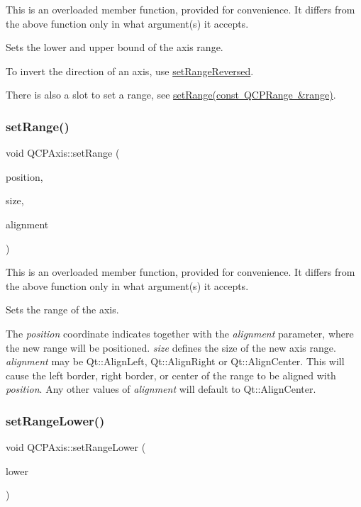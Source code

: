 This is an overloaded member function, provided for convenience. It differs from the above function only in what argument(s) it accepts.

Sets the lower and upper bound of the axis range.

To invert the direction of an axis, use \mbox{\hyperlink{class_q_c_p_axis_a2172fdb196b1a0dc3f40992fcad8e9e1}{set\+Range\+Reversed}}.

There is also a slot to set a range, see \mbox{\hyperlink{class_q_c_p_axis_aebdfea5d44c3a0ad2b4700cd4d25b641}{set\+Range(const Q\+C\+P\+Range \&range)}}. \mbox{\label{class_q_c_p_axis_acf60e5b2d631fbc8c4548c3d579cb6d0}} 
\subsubsection{\texorpdfstring{setRange()}{setRange()}\hspace{0.1cm}{\footnotesize\ttfamily [3/3]}}
{\footnotesize\ttfamily void Q\+C\+P\+Axis\+::set\+Range (\begin{DoxyParamCaption}\item[{double}]{position,  }\item[{double}]{size,  }\item[{Qt\+::\+Alignment\+Flag}]{alignment }\end{DoxyParamCaption})}

This is an overloaded member function, provided for convenience. It differs from the above function only in what argument(s) it accepts.

Sets the range of the axis.

The {\itshape position} coordinate indicates together with the {\itshape alignment} parameter, where the new range will be positioned. {\itshape size} defines the size of the new axis range. {\itshape alignment} may be Qt\+::\+Align\+Left, Qt\+::\+Align\+Right or Qt\+::\+Align\+Center. This will cause the left border, right border, or center of the range to be aligned with {\itshape position}. Any other values of {\itshape alignment} will default to Qt\+::\+Align\+Center. \mbox{\label{class_q_c_p_axis_afcf51227d337db28d1a9ce9a4d1bc91a}} 
\subsubsection{\texorpdfstring{setRangeLower()}{setRangeLower()}}
{\footnotesize\ttfamily void Q\+C\+P\+Axis\+::set\+Range\+Lower (\begin{DoxyParamCaption}\item[{double}]{lower }\end{DoxyParamCaption})}

